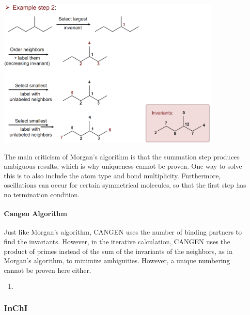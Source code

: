 \begin{enumerate}
    \begin{center}\includegraphics[width=0.85\textwidth]{img/cheminformatics/Morgan2.png}\end{center}
\end{enumerate}

The main criticism of Morgan's algorithm is that the summation step produces ambiguous results, which is why uniqueness cannot be proven. One way to solve this is to also include the atom type and bond multiplicity. Furthermore, oscillations can occur for certain symmetrical molecules, so that the first step has no termination condition.

%

\paragraph{Cangen Algorithm}

Just like Morgan's algorithm, CANGEN uses the number of binding partners to find the invariants. However, in the iterative calculation, CANGEN uses the product of primes instead of the sum of the invariants of the neighbors, as in Morgan's algorithm, to minimize ambiguities. However, a unique numbering cannot be proven here either.

\begin{enumerate}
    \item 
\end{enumerate}

%

\subsubsection{InChI}

